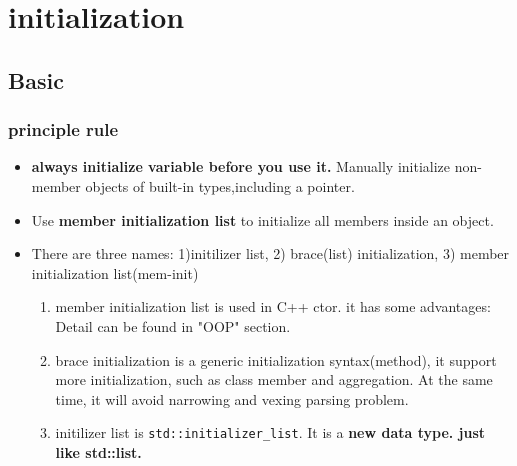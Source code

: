 \documentclass[a4paper,12pt,twoside]{book}
\begin{document}
\chapter{initialization}
\section{Basic}

\subsection{principle rule}
\begin{itemize}
	\item \textbf{always initialize variable before you use it.} Manually initialize non-member objects of built-in types,including a pointer.
	
	\item Use \textbf{member initialization list} to initialize all members inside an object.
	
	\item There are three names: 1)initilizer list, 2) brace(list) initialization, 3) member initialization list(mem-init)
	\begin{enumerate}
		\item member initialization list is used in C++ ctor. it has some advantages: Detail can be found in "OOP" section. 
		
		\item brace initialization is a generic initialization syntax(method), it support more initialization, such as class member and aggregation. At the same time, it will avoid narrowing and vexing parsing problem. 
		
		\item initilizer list is \texttt{std::initializer\_list}. It is a \textbf{new data type. just like std::list.}
	\end{enumerate}
\end{itemize}
\end{document}
